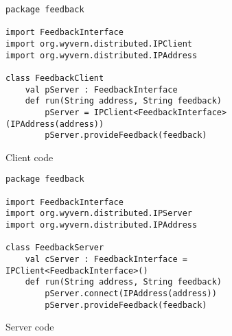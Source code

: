 \documentclass[runningheads]{llncs}
\begin{document}
\begin{sloppypar}
\begin{figure}[t]
\begin{lstlisting}
package feedback

import FeedbackInterface
import org.wyvern.distributed.IPClient
import org.wyvern.distributed.IPAddress

class FeedbackClient
    val pServer : FeedbackInterface
    def run(String address, String feedback)
        pServer = IPClient<FeedbackInterface>(IPAddress(address))
        pServer.provideFeedback(feedback)
\end{lstlisting}
\caption{Client code}
\label{f-client}
\end{figure}

\begin{figure}[t]
\begin{lstlisting}
package feedback

import FeedbackInterface
import org.wyvern.distributed.IPServer
import org.wyvern.distributed.IPAddress

class FeedbackServer
    val cServer : FeedbackInterface = IPClient<FeedbackInterface>()
    def run(String address, String feedback)
        pServer.connect(IPAddress(address))
        pServer.provideFeedback(feedback)
\end{lstlisting}
\caption{Server code}
\label{f-server}
\end{figure}






\end{sloppypar}
\end{document}
